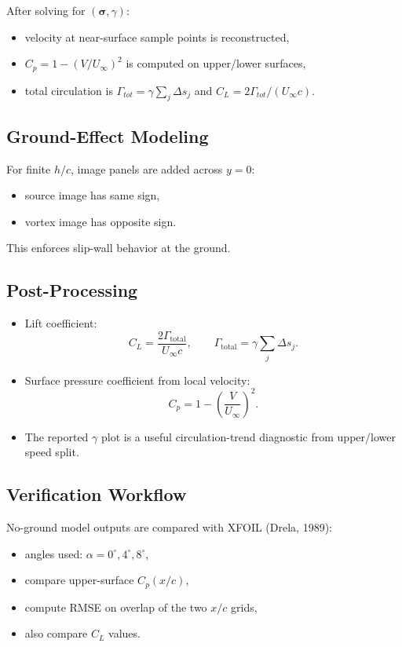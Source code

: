 \documentclass[11pt]{article}
\begin{document}
After solving for $(\boldsymbol{\sigma},\gamma)$:
\begin{itemize}
  \item velocity at near-surface sample points is reconstructed,
  \item $C_p = 1-(V/U_\infty)^2$ is computed on upper/lower surfaces,
  \item total circulation is $\Gamma_{tot}=\gamma\sum_j \Delta s_j$ and
  $C_L=2\Gamma_{tot}/(U_\infty c)$.
\end{itemize}

\subsection{Ground-Effect Modeling}
For finite $h/c$, image panels are added across $y=0$:
\begin{itemize}
  \item source image has same sign,
  \item vortex image has opposite sign.
\end{itemize}
This enforces slip-wall behavior at the ground.

\subsection{Post-Processing}
\begin{itemize}
  \item Lift coefficient:
  \[
  C_L = \frac{2\Gamma_{\text{total}}}{U_\infty c},\qquad
  \Gamma_{\text{total}} = \gamma\sum_j \Delta s_j.
  \]
  \item Surface pressure coefficient from local velocity:
  \[
  C_p = 1 - \left(\frac{V}{U_\infty}\right)^2.
  \]
  \item The reported $\gamma$ plot is a useful circulation-trend diagnostic from upper/lower speed split.
\end{itemize}

\subsection{Verification Workflow}
No-ground model outputs are compared with XFOIL (Drela, 1989):
\begin{itemize}
  \item angles used: $\alpha = 0^\circ, 4^\circ, 8^\circ$,
  \item compare upper-surface $C_p(x/c)$,
  \item compute RMSE on overlap of the two $x/c$ grids,
  \item also compare $C_L$ values.
\end{itemize}
\end{document}
